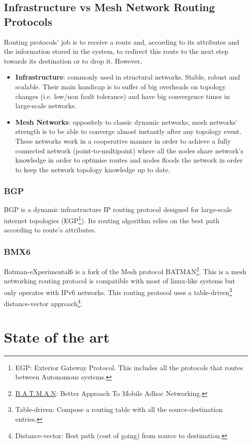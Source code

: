 \subsection{Infrastructure vs Mesh Network Routing Protocols}
\label{subsec:dsrp}
Routing protocols' job is to receive a route and, according to its attributes and the information stored in the system, to redirect this route to the next step towards its destination or to drop it. However, 

\begin{itemize}
    \item \textbf{Infrastructure}: commonly used in structural networks. Stable, robust and scalable. Their main handicap is to suffer of big overheads on topology changes (i.e. low/non fault tolerance) and have big convergence times in large-scale networks.
    \item \textbf{Mesh Networks}: oppositely to classic dynamic networks, mesh networks' strength is to be able to converge almost instantly after any topology event. These networks work in a cooperative manner in order to achieve a fully connected network (point-to-multipoint) where all the nodes share network's knowledge in order to optimise routes and nodes floods the network in order to keep the network topology knowledge up to date.
\end{itemize}

\subsubsection{BGP}
\label{subsubsec:bgp}
BGP is a dynamic infrastructure IP routing protocol designed for large-scale internet topologies (EGP\footnote{EGP: Exterior Gateway Protocol. This includes all the protocols that routes between Autonomous systems.}). Its routing algorithm relies on the best path according to route's attributes.

\subsubsection{BMX6}
\label{subsec:bmx6}
Batman-eXperimental6 \cite{bmx6} is a fork of the Mesh protocol BATMAN\footnote{\href{https://www.open-mesh.org/projects/open-mesh/wiki}{B.A.T.M.A.N}: Better Approach To Mobile Adhoc Networking.}. This is a mesh networking routing protocol is compatible with most of linux-like systems but only operates with IPv6 networks. This routing protocol uses a table-driven\footnote{Table-driven: Compose a routing table with all the source-destination entries.} distance-vector approach\footnote{Distance-vector: Best path (cost of going) from source to destination.}.


\section{State of the art}
\label{sec:soa}
